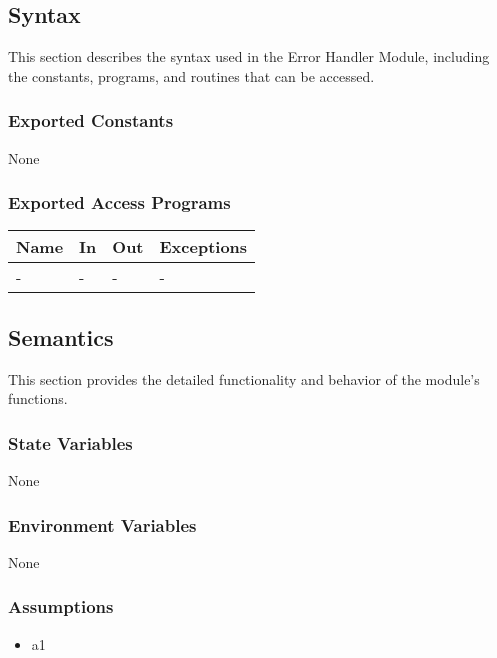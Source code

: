 \documentclass[12pt, titlepage]{article}
\begin{document}
\subsection{Syntax}

This section describes the syntax used in the Error Handler Module, including
the constants, programs, and routines that can be accessed.

\subsubsection{Exported Constants}

None

\subsubsection{Exported Access Programs}

\begin{center}
\begin{tabular}{p{2cm} p{4cm} p{4cm} p{2cm}}
\hline
\textbf{Name} & \textbf{In} & \textbf{Out} & \textbf{Exceptions} \\
\hline
- & - & - & - \\
\hline
\end{tabular}
\end{center}

\subsection{Semantics}

This section provides the detailed functionality and behavior of the module’s
functions.

\subsubsection{State Variables}

None

\subsubsection{Environment Variables}

None

\subsubsection{Assumptions}

\begin{itemize}
\item a1
\end{itemize}
\end{document}
